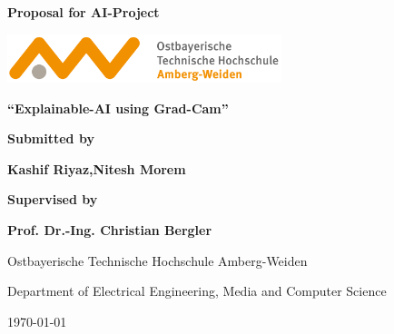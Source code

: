 \documentclass{article}
\begin{document}
\begin{titlepage}
  \begin{center}
    \vspace*{2cm}

    {\Huge\bfseries Proposal for AI-Project}

    \vspace{1.5cm}

    \includegraphics[width = 8cm]{assets/oth.png}

    \vspace{1.5cm}

    {\Large\bfseries ``Explainable-AI using Grad-Cam''}

    \vspace{2cm}

    {\small\bfseries Submitted by}

    \vspace{0.25cm}

    {\Large\bfseries Kashif Riyaz,Nitesh Morem}

    \vspace{1cm}

    {\small\bfseries Supervised by}

    \vspace{0.25cm}

    {\Large\bfseries Prof. Dr.-Ing. Christian Bergler}

    \vspace{2cm}

    \begin{center}
      {\small Ostbayerische Technische Hochschule Amberg-Weiden}

      {\small Department of Electrical Engineering, Media and Computer Science}
    \end{center}

    \vfill

    {\large\today}
  \end{center}
\end{titlepage}
\end{document}
